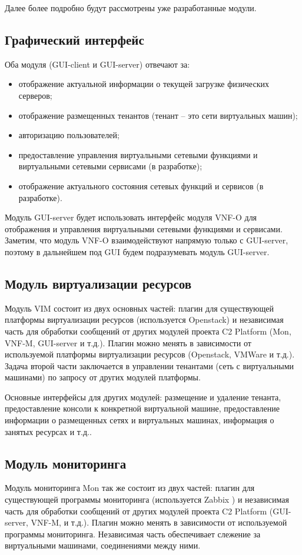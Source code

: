 \documentclass[oneside,final,14pt,a4paper]{extreport}
\begin{document}
Далее более подробно будут рассмотрены уже разработанные модули.

\subsection{Графический интерфейс}
Оба модуля (GUI-client и GUI-server) отвечают за:
\begin{itemize}
	\item отображение актуальной информации о текущей загрузке физических серверов;
	\item отображение размещенных тенантов (тенант -- это сети виртуальных машин);
	\item авторизацию пользователей;
	\item предоставление управления виртуальными сетевыми функциями и виртуальными сетевыми сервисами (в разработке);
	\item отображение актуального состояния сетевых функций и сервисов (в разработке).
\end{itemize}

Модуль GUI-server будет использовать интерфейс модуля VNF-O для отображения и управления виртуальными сетевыми функциями и сервисами. Заметим, что модуль VNF-O взаимодействуют напрямую только с GUI-server, поэтому в дальнейшем под GUI будем подразумевать модуль GUI-server.

\subsection{Модуль виртуализации ресурсов}
Модуль VIM состоит из двух основных частей: плагин для существующей платформы виртуализации ресурсов (используется Openstack) и независимая часть для обработки сообщений от других модулей проекта C2 Platform (Mon, VNF-M, GUI-server и т.д.). Плагин можно менять в зависимости от используемой платформы виртуализации ресурсов (Openstack, VMWare и т.д.). Задача второй части заключается в управлении тенантами (сеть с виртуальными машинами) по запросу от других модулей платформы. 

Основные интерфейсы для других модулей: размещение и удаление тенанта, предоставление консоли к конкретной виртуальной машине, предоставление информации о размещенных сетях и виртуальных машинах, информация о занятых ресурсах и т.д..

\subsection{Модуль мониторинга}
Модуль мониторинга Mon так же состоит из двух частей: плагин для существующей программы мониторинга (используется Zabbix \cite{bib:zabbix}) и независимая часть для обработки сообщений от других модулей проекта C2 Platform (GUI-server, VNF-M, и т.д.). Плагин можно менять в зависимости от используемой программы мониторинга. Независимая часть обеспечивает слежение за виртуальными машинами, соединениями между ними.
\end{document}
